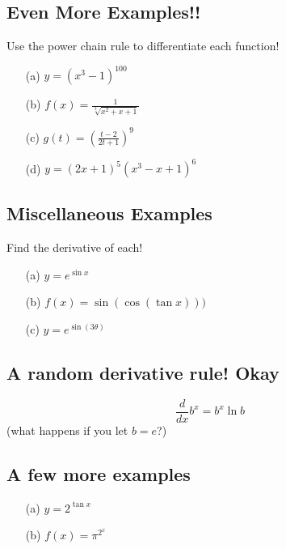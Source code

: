 \documentclass[12pt]{book}
\theoremstyle{definition}
\begin{document}
\subsection*{Even More Examples!!}
Use the power chain rule to differentiate each function!
\begin{itemize}
    \item[(a)]$y=(x^3-1)^{100}$\vspace{4cm}
    \item[(b)]$f(x)=\frac{1}{\sqrt[3]{x^2+x+1}}$\vspace{3cm}\raggedbottom\clearpage
    \item[(c)]$g(t)=\left(\frac{t-2}{2t+1}\right)^9$\vspace{4cm}
    \item[(d)]$y=(2x+1)^5(x^3-x+1)^6$\vspace{3cm}
\end{itemize}
\subsection*{Miscellaneous Examples}
Find the derivative of each!
\begin{itemize}
    \item[(a)] $y=e^{\sin x}$\vspace{3cm}
    \item[(b)] $f(x)=\sin(\cos(\tan x)))$\vspace{5cm}
    \item[(c)] $y=e^{\sin(3\theta)}$\vspace{3cm}
\end{itemize}
\raggedbottom
\clearpage
\begin{tcolorbox}
\subsection*{A random derivative rule! Okay}
\[
\frac{d}{dx}b^x=b^x\ln b
\]
(what happens if you let $b=e$?)
\end{tcolorbox}
\subsection*{A few more examples}
\begin{itemize}
    \item[(a)] $y=2^{\tan x}$\vspace{5cm}
    \item[(b)] $f(x)=\pi^{2^x}$
\end{itemize}
\end{document}
